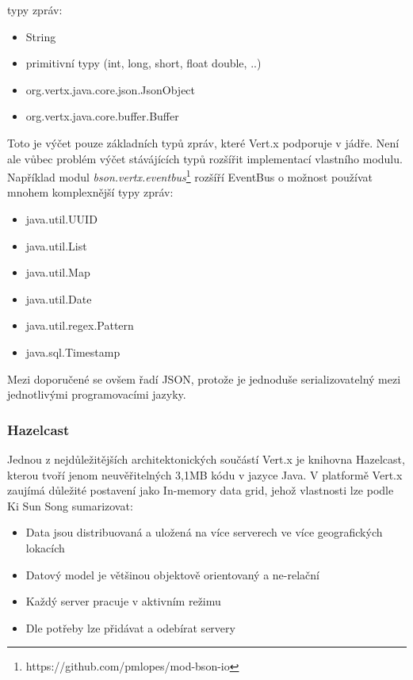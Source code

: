 typy zpráv:
\begin{itemize}
\item{String}
\item{primitivní typy (int, long, short, float double, ..)}
\item{org.vertx.java.core.json.JsonObject}
\item{org.vertx.java.core.buffer.Buffer}
\end{itemize}

Toto je výčet pouze základních typů zpráv, které Vert.x podporuje v jádře. Není ale vůbec problém výčet stávájících typů rozšířit implementací vlastního modulu. Například modul \emph{bson.vertx.eventbus}\footnote{https://github.com/pmlopes/mod-bson-io} rozšíří EventBus o možnost používat mnohem komplexnější typy zpráv:

\begin{itemize}
\item{java.util.UUID}	
\item{java.util.List}
\item{java.util.Map}
\item{java.util.Date}
\item{java.util.regex.Pattern}
\item{java.sql.Timestamp}
\end{itemize}

Mezi doporučené se ovšem řadí JSON, protože je jednoduše serializovatelný mezi jednotlivými programovacími jazyky.

\subsubsection{Hazelcast}\label{sub:hazelcast}

Jednou z nejdůležitějších architektonických součástí Vert.x je knihovna Hazelcast, kterou tvoří jenom neuvěřitelných 3,1MB kódu v jazyce Java. V platformě Vert.x zaujímá důležité postavení jako In-memory data grid, jehož vlastnosti \cite{inMemoryDataGrid} lze podle Ki Sun Song sumarizovat:
\begin{itemize}
\item{Data jsou distribuovaná a uložená na více serverech ve více geografických lokacích}
\item{Datový model je většinou objektově orientovaný a ne-relační}
\item{Každý server pracuje v aktivním režimu}
\item{Dle potřeby lze přidávat a odebírat servery}
\end{itemize}

